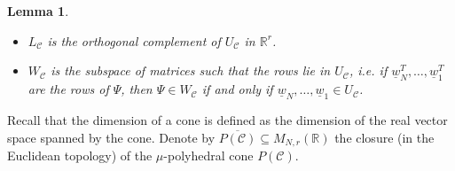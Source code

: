 \documentclass[12pt, a4article]{amsart}   	%
\numberwithin{equation}{section}
\theoremstyle{plain}
\newtheorem{lemma}[theorem]{Lemma}
\theoremstyle{definition}
\newcommand{\R}{{\mathbb R}}
\newcommand{\mcC}{{\mathcal C}}
\newcommand{\uw}{{\underline w}}
\begin{document}
\begin{lemma}\label{lem:row:lemma}
\begin{itemize}
\item[{\rm (i)}] $L_\mcC$ is the orthogonal complement of $U_\mcC$ in  $\R^r$. 
\item[{\rm (ii)}]  $W_\mcC$ is the subspace of matrices such that the rows lie in $U_\mcC$,  i.e.
if $\uw^T_N,\ldots,\uw^T_1$ are the rows of $\Psi$, then $\Psi\in  W_\mcC$ if and only if $\uw_N,\ldots,\uw_1\in U_\mcC$.
\end{itemize}
\end{lemma}

Recall that the dimension of a cone is defined as the dimension of the real vector space spanned by the cone. Denote by $\overline{P(\mcC)}\subseteq M_{N,r}(\mathbb R)$ the closure (in the Euclidean topology) of the $\mu$-polyhedral cone 
$P(\mcC)$.
\end{document}
